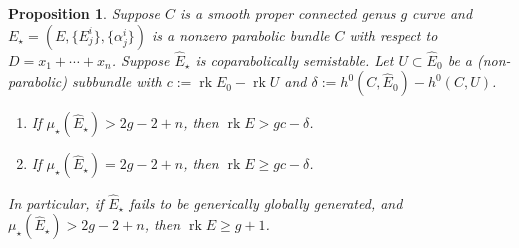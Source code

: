 \documentclass[12 pt]{amsart}
\theoremstyle{plain}
\newtheorem{proposition}[subsubsection]{Proposition}
\theoremstyle{definition}
\theoremstyle{remark}
\numberwithin{equation}{section}
\DeclareMathOperator\rk{rk}
\begin{document}
\begin{proposition}
	\label{proposition:generic-parabolic-global-generation}
	Suppose $C$ is a smooth proper connected genus $g$ curve and
	$E_\star = (E, \{E^i_j\}, \{\alpha^i_j\})$ is a nonzero parabolic bundle $C$
	with respect to $D = x_1 + \cdots + x_n$.
		Suppose $\widehat{E}_\star$ is coparabolically semistable. 
		Let $U \subset \widehat E_0$ be a (non-parabolic) subbundle with
		$c := \rk E_0 - \rk U$
		and
		$\delta := h^0(C, \widehat{E}_0) - h^0(C, U)$.
	\begin{enumerate}
		\item[(I)] If $\mu_\star(\widehat{E}_\star)> 2g-2 + n$, 
		then $\rk E >
			gc - \delta$.
		\item[(II)] If $\mu_\star(\widehat{E}_\star)= 2g-2+n$, then $\rk
			E \geq gc - \delta$.
	\end{enumerate}
	In particular, if $\widehat{E}_\star$
	fails to be generically globally generated, and 
	$\mu_\star(\widehat{E}_\star)> 2g-2 + n$, then $\rk E \geq g	+ 1$.
\end{proposition}
\end{document}
